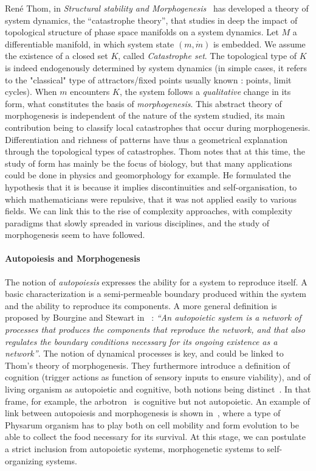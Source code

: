 \documentclass[fleqn,10pt]{wlscirep}
\begin{document}
Ren{\'e} Thom, in \emph{Structural stability and Morphogenesis}~\cite{thom1974stabilite} has developed a theory of system dynamics, the ``catastrophe theory'', that studies in deep the impact of topological structure of phase space manifolds on a system dynamics. Let $M$ a differentiable manifold, in which system state $(m,\dot{m})$ is embedded. We assume the existence of a closed set $K$, called \emph{Catastrophe set}. The topological type of $K$ is indeed endogenously determined by system dynamics (in simple cases, it refers to the "classical" type of attractors/fixed points usually known : points, limit cycles). When $m$ encounters $K$, the system follows a \emph{qualitative} change in its form, what constitutes the basis of \emph{morphogenesis}. This abstract theory of morphogenesis is independent of the nature of the system studied, its main contribution being to classify local catastrophes that occur during morphogenesis. Differentiation and richness of patterns have thus a geometrical explanation through the topological types of catastrophes. Thom notes that at this time, the study of form has mainly be the focus of biology, but that many applications could be done in physics and geomorphology for example. He formulated the hypothesis that it is because it implies discontinuities and self-organisation, to which mathematicians were repulsive, that it was not applied easily to various fields. We can link this to the rise of complexity approaches, with complexity paradigms that slowly spreaded in various disciplines, and the study of morphogenesis seem to have followed.


\paragraph{Autopoiesis and Morphogenesis}

The notion of \emph{autopoiesis} expresses the ability for a system to reproduce itself. A basic characterization is a semi-permeable boundary produced within the system and the ability to reproduce its components. A more general definition is proposed by Bourgine and Stewart in~\cite{bourgine2004autopoiesis} : \textit{``An autopoietic system is a network of processes that produces the components that reproduce the network, and that also regulates the boundary conditions necessary for its ongoing existence as a network''}. The notion of dynamical processes is key, and could be linked to Thom's theory of morphogenesis. They furthermore introduce a definition of cognition (trigger actions as function of sensory inputs to ensure viability), and of living organism as autopoietic and cognitive, both notions being distinct~\cite{bitbol_autopoiesis_2004}. In that frame, for example, the arbotron~\cite{jun2005formation} is cognitive but not autopoietic. An example of link between autopoiesis and morphogenesis is shown in~\cite{niizato2010model}, where a type of Physarum organism has to play both on cell mobility and form evolution to be able to collect the food necessary for its survival. At this stage, we can postulate a strict inclusion from autopoietic systems, morphogenetic systems to self-organizing systems.
\end{document}

